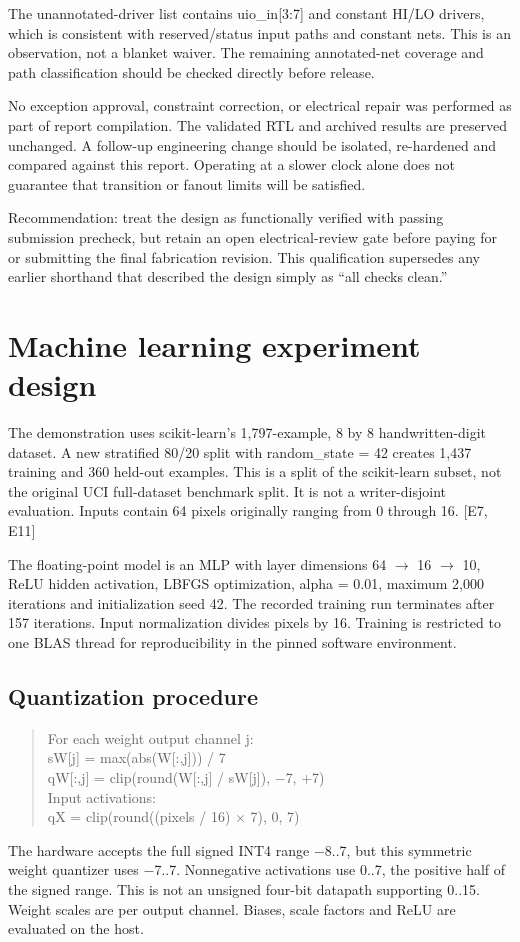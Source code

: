 \documentclass[10pt,letterpaper]{article}
\begin{document}
The unannotated-driver list contains uio\_in[3:7] and constant HI/LO drivers, which is consistent with reserved/status input paths and constant nets. This is an observation, not a blanket waiver. The remaining annotated-net coverage and path classification should be checked directly before release.

No exception approval, constraint correction, or electrical repair was performed as part of report compilation. The validated RTL and archived results are preserved unchanged. A follow-up engineering change should be isolated, re-hardened and compared against this report. Operating at a slower clock alone does not guarantee that transition or fanout limits will be satisfied.

Recommendation: treat the design as functionally verified with passing submission precheck, but retain an open electrical-review gate before paying for or submitting the final fabrication revision. This qualification supersedes any earlier shorthand that described the design simply as ``all checks clean.''

\clearpage
\section{Machine learning experiment design}
The demonstration uses scikit-learn's 1,797-example, 8 by 8 handwritten-digit dataset. A new stratified 80/20 split with random\_state = 42 creates 1,437 training and 360 held-out examples. This is a split of the scikit-learn subset, not the original UCI full-dataset benchmark split. It is not a writer-disjoint evaluation. Inputs contain 64 pixels originally ranging from 0 through 16. [E7, E11]

The floating-point model is an MLP with layer dimensions 64 \ensuremath{\rightarrow} 16 \ensuremath{\rightarrow} 10, ReLU hidden activation, LBFGS optimization, alpha = 0.01, maximum 2,000 iterations and initialization seed 42. The recorded training run terminates after 157 iterations. Input normalization divides pixels by 16. Training is restricted to one BLAS thread for reproducibility in the pinned software environment.

\subsection*{Quantization procedure}
\begin{quote}\ttfamily\small For each weight output channel j:\\
  sW[j] = max(abs(W[:,j])) / 7\\
  qW[:,j] = clip(round(W[:,j] / sW[j]), \ensuremath{-}7, +7)\\
Input activations:\\
  qX = clip(round((pixels / 16) \ensuremath{\times} 7), 0, 7)\end{quote}
The hardware accepts the full signed INT4 range \ensuremath{-}8..7, but this symmetric weight quantizer uses \ensuremath{-}7..7. Nonnegative activations use 0..7, the positive half of the signed range. This is not an unsigned four-bit datapath supporting 0..15. Weight scales are per output channel. Biases, scale factors and ReLU are evaluated on the host.
\end{document}
